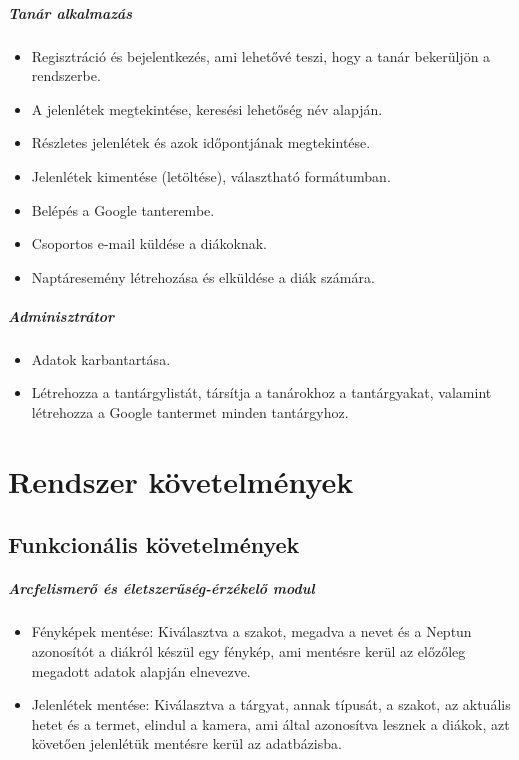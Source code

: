 \subparagraph*{Tanár alkalmazás}
\begin{itemize}
	\item {Regisztráció és bejelentkezés, ami lehetővé teszi, hogy a tanár bekerüljön a rendszerbe.}
	\item {A jelenlétek megtekintése, keresési lehetőség név alapján.}
	\item {Részletes jelenlétek és azok időpontjának  megtekintése.}
	\item {Jelenlétek kimentése (letöltése), választható formátumban.}
	\item {Belépés a Google tanterembe.}
	\item {Csoportos e-mail küldése a diákoknak.}
	\item {Naptáresemény létrehozása és elküldése a diák számára.}\\
\end{itemize}

\subparagraph*{Adminisztrátor}

\begin{itemize}
	\item {Adatok karbantartása.}
	\item {Létrehozza a tantárgylistát, társítja a tanárokhoz a tantárgyakat, valamint létrehozza a Google tantermet minden tantárgyhoz.}\\
\end{itemize}


\section{Rendszer követelmények}
\subsection{Funkcionális követelmények}

\subparagraph*{Arcfelismerő és életszerűség-érzékelő modul}
\begin{itemize}
    \item Fényképek mentése: Kiválasztva a szakot, megadva a nevet és a Neptun azonosítót a diákról készül egy fénykép, ami mentésre kerül az előzőleg megadott adatok alapján elnevezve.
    \item Jelenlétek mentése: Kiválasztva a tárgyat, annak típusát, a szakot, az aktuális hetet és a termet, elindul a kamera, ami által azonosítva lesznek a diákok, azt követően jelenlétük mentésre kerül az adatbázisba.
\end{itemize}


